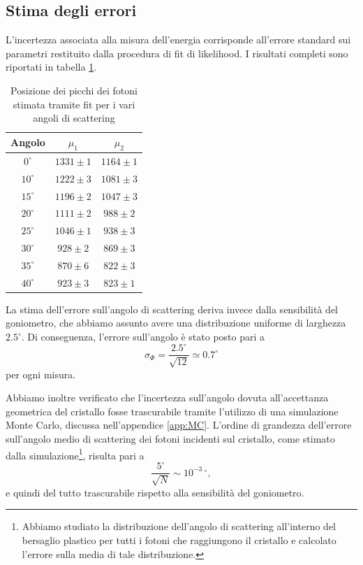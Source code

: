 \documentclass[10pt,twocolumn]{article}
\begin{document}
\subsection{Stima degli errori}
\label{subsec:errori}

L'incertezza associata alla misura dell'energia corrisponde all'errore standard sui parametri restituito dalla procedura di fit di likelihood. I risultati completi sono riportati in tabella \ref{tab:err}.

\begin{table}[ht]
\centering
\begin{tabular}{ccc} 
\hline
\noalign{\smallskip}
Angolo & $\mu_1$ & $\mu_2$ \\ [0.5ex] 
\hline
\noalign{\smallskip}
$0^\circ$ 	& $1331\pm1$ 	& $1164\pm1$ \\
$10^\circ$ 	& $1222\pm3$ 	& $1081\pm3$ \\
$15^\circ$ 	& $1196\pm2$ 	& $1047\pm3$ \\
$20^\circ$ 	& $1111\pm2$ 	& $988\pm2$ \\
$25^\circ$ 	& $1046\pm1$ 	& $938\pm3$ \\
$30^\circ$ 	& $928\pm2$ 	& $869\pm3$ \\
$35^\circ$ 	& $870\pm6$ 	& $822\pm3$ \\
$40^\circ$ 	& $923\pm3$ 	& $823\pm1$ \\
\hline
\end{tabular}
\caption{Posizione dei picchi dei fotoni stimata tramite fit per i vari angoli di scattering}
\label{tab:err}
\end{table}

La stima dell'errore sull'angolo di scattering deriva invece dalla sensibilità del goniometro, che abbiamo assunto avere una distribuzione uniforme di larghezza $2.5^\circ$. Di conseguenza, l'errore sull'angolo è stato posto pari a
\[
\sigma_\Phi = \frac{2.5^\circ}{\sqrt{12}} \simeq 0.7^\circ
\]
per ogni misura.

Abbiamo inoltre verificato che l'incertezza sull'angolo dovuta all'accettanza geometrica del cristallo fosse trascurabile tramite l'utilizzo di una simulazione Monte Carlo, discussa nell'appendice \ref{app:MC}. L'ordine di grandezza dell'errore sull'angolo medio di scattering dei fotoni incidenti sul cristallo, come stimato dalla simulazione\footnote{Abbiamo studiato la distribuzione dell'angolo di scattering all'interno del bersaglio plastico per tutti i fotoni che raggiungono il cristallo e calcolato l'errore sulla media di tale distribuzione.}, risulta pari a
\[
\frac{5^\circ}{\sqrt{N}} \sim 10^{-3}\,^\circ,
\]
e quindi del tutto trascurabile rispetto alla sensibilità del goniometro.
\end{document}
